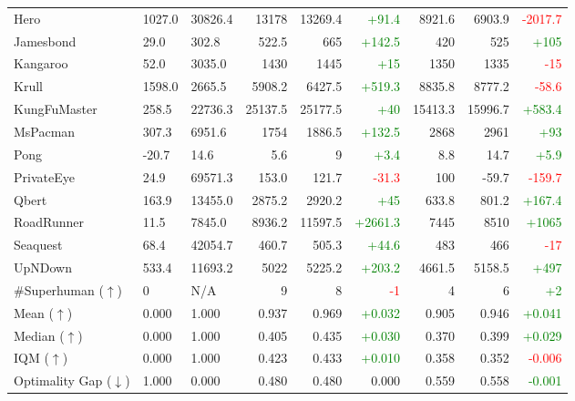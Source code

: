 \documentclass{article} %
\begin{document}
\begin{table}[!t]
{\begin{tabular}{lllrrrrrr}
Hero          & 1027.0 & 30826.4 & 13178 & 13269.4 & \textcolor{green}{+91.4} & 8921.6 & 6903.9 & \textcolor{red}{-2017.7} \\
Jamesbond     & 29.0 & 302.8 & 522.5 & 665 & \textcolor{green}{+142.5} & 420 & 525 & \textcolor{green}{+105} \\
Kangaroo      & 52.0 & 3035.0 & 1430 & 1445 & \textcolor{green}{+15} & 1350 & 1335 & \textcolor{red}{-15} \\
Krull         & 1598.0 & 2665.5 & 5908.2 & 6427.5 & \textcolor{green}{+519.3} & 8835.8 & 8777.2 & \textcolor{red}{-58.6} \\
KungFuMaster  & 258.5 & 22736.3 & 25137.5 & 25177.5 & \textcolor{green}{+40} & 15413.3 & 15996.7 & \textcolor{green}{+583.4} \\
MsPacman      & 307.3 & 6951.6 & 1754 & 1886.5 & \textcolor{green}{+132.5} & 2868 & 2961 & \textcolor{green}{+93} \\
Pong          & -20.7 & 14.6 & 5.6 & 9 & \textcolor{green}{+3.4} & 8.8 & 14.7 & \textcolor{green}{+5.9} \\
PrivateEye    & 24.9 & 69571.3 & 153.0 & 121.7 & \textcolor{red}{-31.3} & 100 & -59.7 & \textcolor{red}{-159.7} \\
Qbert         & 163.9 & 13455.0 & 2875.2 & 2920.2 & \textcolor{green}{+45} & 633.8 & 801.2 & \textcolor{green}{+167.4} \\
RoadRunner    & 11.5 & 7845.0 & 8936.2 & 11597.5 & \textcolor{green}{+2661.3} & 7445 & 8510 & \textcolor{green}{+1065} \\
Seaquest      & 68.4 & 42054.7 & 460.7 & 505.3 & \textcolor{green}{+44.6} & 483 & 466 & \textcolor{red}{-17} \\
UpNDown       & 533.4 & 11693.2 & 5022 & 5225.2 & \textcolor{green}{+203.2} & 4661.5 & 5158.5 & \textcolor{green}{+497} \\
\midrule
\#Superhuman ($\uparrow$) & 0 & N/A & 9 & 8 & \textcolor{red}{-1} & 4 & 6 & \textcolor{green}{+2} \\
Mean ($\uparrow$) & 0.000 & 1.000 & 0.937 & 0.969 & \textcolor{green}{+0.032} & 0.905 & 0.946 & \textcolor{green}{+0.041} \\
Median ($\uparrow$) & 0.000 & 1.000 & 0.405 & 0.435 & \textcolor{green}{+0.030} & 0.370 & 0.399 & \textcolor{green}{+0.029} \\
IQM ($\uparrow$) & 0.000 & 1.000 & 0.423 & 0.433 & \textcolor{green}{+0.010} & 0.358 & 0.352 & \textcolor{red}{-0.006} \\
Optimality Gap ($\downarrow$) & 1.000 & 0.000 & 0.480 & 0.480 & 0.000 & 0.559 & 0.558 & \textcolor{green}{-0.001} \\
\bottomrule
\end{tabular}
}
\end{table}
\end{document}

